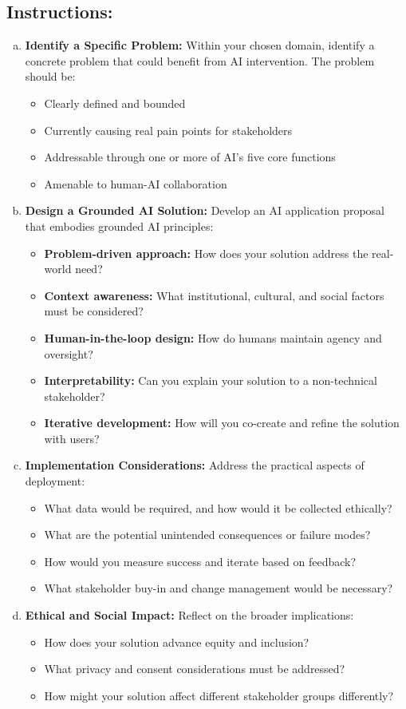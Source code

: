 \documentclass[11pt]{article}
\begin{document}
\subsection*{Instructions:}
\begin{enumerate}[(a)]
\item \textbf{Identify a Specific Problem:} Within your chosen domain, identify a concrete problem that could benefit from AI intervention. The problem should be:
\begin{itemize}
\item Clearly defined and bounded
\item Currently causing real pain points for stakeholders
\item Addressable through one or more of AI's five core functions
\item Amenable to human-AI collaboration
\end{itemize}

\item \textbf{Design a Grounded AI Solution:} Develop an AI application proposal that embodies grounded AI principles:
\begin{itemize}
\item \textbf{Problem-driven approach:} How does your solution address the real-world need?
\item \textbf{Context awareness:} What institutional, cultural, and social factors must be considered?
\item \textbf{Human-in-the-loop design:} How do humans maintain agency and oversight?
\item \textbf{Interpretability:} Can you explain your solution to a non-technical stakeholder?
\item \textbf{Iterative development:} How will you co-create and refine the solution with users?
\end{itemize}

\item \textbf{Implementation Considerations:} Address the practical aspects of deployment:
\begin{itemize}
\item What data would be required, and how would it be collected ethically?
\item What are the potential unintended consequences or failure modes?
\item How would you measure success and iterate based on feedback?
\item What stakeholder buy-in and change management would be necessary?
\end{itemize}

\item \textbf{Ethical and Social Impact:} Reflect on the broader implications:
\begin{itemize}
\item How does your solution advance equity and inclusion?
\item What privacy and consent considerations must be addressed?
\item How might your solution affect different stakeholder groups differently?
\end{itemize}
\end{enumerate}
\end{document}
